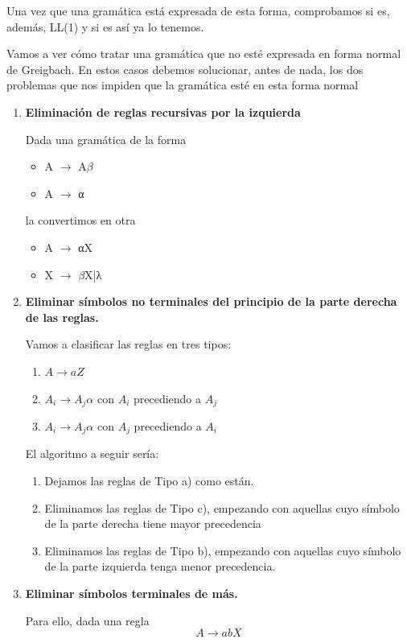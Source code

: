 \documentclass{apuntes}
\begin{document}
Una vez que una gramática está expresada de esta forma, comprobamos si es, además, LL(1) y si es así ya lo tenemos.

Vamos a ver cómo tratar una gramática que no esté expresada en forma normal de Greigbach. En estos casos debemos solucionar, antes de nada, los dos problemas que nos impiden que la gramática esté en esta forma normal

\begin{enumerate}
\item \textbf{Eliminación de reglas recursivas por la izquierda}

Dada una gramática de la forma
\begin{itemize}
\item A $\rightarrow$ A$\beta$
\item A $\rightarrow$ α
\end{itemize}
la convertimos en otra
\begin{itemize}
\item A $\rightarrow$ αX
\item X $\rightarrow$ $\beta$X|λ
\end{itemize}

\item \textbf{Eliminar símbolos no terminales del principio de la parte derecha de las reglas.}


Vamos a clasificar las reglas en tres tipos:
\begin{enumerate}
\item $A \rightarrow aZ$
\item $A_i \rightarrow A_jα$ con $A_i$ precediendo a $A_j$
\item $A_i \rightarrow A_jα$ con $A_j$ precediendo a $A_i$
\end{enumerate}

El algoritmo a seguir sería:
\begin{enumerate}
\item Dejamos las reglas de Tipo a) como están.
\item Eliminamos las reglas de Tipo c), empezando con aquellas cuyo símbolo de la parte derecha tiene mayor precedencia
\item Eliminamos las reglas de Tipo b), empezando con aquellas cuyo símbolo de la parte izquierda tenga menor precedencia.
\end{enumerate}
\item \textbf{Eliminar símbolos terminales de más.}

Para ello, dada una regla
\[A \rightarrow abX\]


\end{enumerate}
\end{document}
